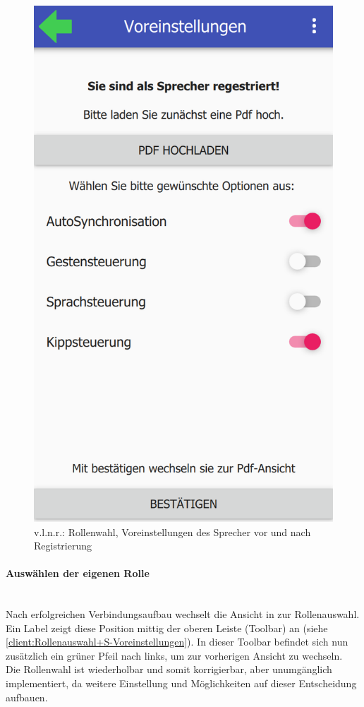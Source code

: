 \begin{figure}[ht!]
\begin{minipage}{0.31\linewidth}
		\includegraphics[scale=0.5]{GUI/Bilder/3-S-5-Voreinstellung.PNG}
	\end{minipage}
	\caption{v.l.n.r.: Rollenwahl, Voreinstellungen des Sprecher vor und nach Registrierung{\tiny}}
	\label{client:Rollenauswahl+S-Voreinstellungen}
\end{figure}

\newpage

\paragraph{Auswählen der eigenen Rolle}$\;$\\
Nach erfolgreichen Verbindungsaufbau wechselt die Ansicht in zur Rollenauswahl. Ein Label zeigt diese Position mittig der oberen Leiste (Toolbar) an (siehe \autoref{client:Rollenauswahl+S-Voreinstellungen}).
In dieser Toolbar befindet sich nun zusätzlich ein grüner Pfeil nach links, um zur vorherigen Ansicht zu wechseln.
\\Die Rollenwahl ist wiederholbar und somit korrigierbar, aber unumgänglich implementiert, da weitere Einstellung und Möglichkeiten auf dieser Entscheidung aufbauen.

